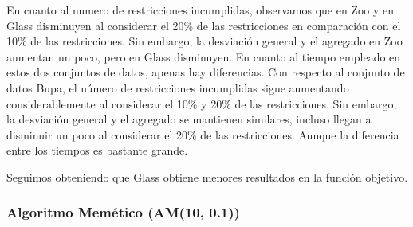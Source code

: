 En cuanto al numero de restricciones incumplidas, observamos que en Zoo y en Glass disminuyen al considerar el 20\% de las restricciones en comparación con el 10\% de las restricciones.
Sin embargo, la desviación general y el agregado en Zoo aumentan un poco, pero en Glass disminuyen. En cuanto al tiempo empleado en estos dos conjuntos de datos, apenas hay diferencias.
Con respecto al conjunto de datos Bupa, el número de restricciones incumplidas sigue aumentando considerablemente al considerar el 10\% y 20\% de las restricciones. Sin embargo, la desviación general y el agregado 
se mantienen similares, incluso llegan a disminuir un poco al considerar el 20\% de las restricciones. Aunque la diferencia entre los tiempos es bastante grande.

Seguimos obteniendo que Glass obtiene menores resultados en la función objetivo.


\subsubsection{Algoritmo Memético (AM(10, 0.1))}


